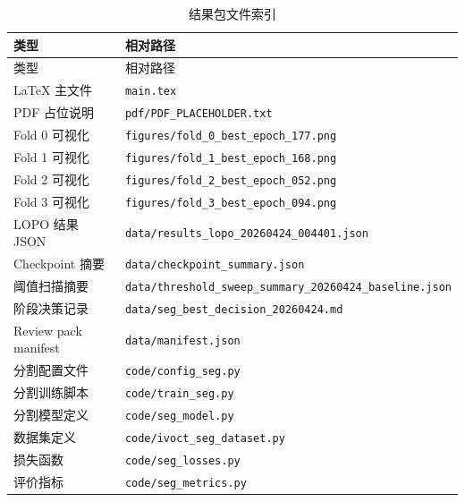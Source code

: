 \documentclass[UTF8,11pt]{ctexart}
\begin{document}
\begin{longtable}{p{}p{}}
\caption{结果包文件索引}
\label{tab:file-index}\\
\toprule
类型 & 相对路径 \\
\midrule
\endfirsthead
\toprule
类型 & 相对路径 \\
\midrule
\endhead
LaTeX 主文件 & \texttt{main.tex} \\
PDF 占位说明 & \texttt{pdf/PDF\_PLACEHOLDER.txt} \\
Fold 0 可视化 & \texttt{figures/fold\_0\_best\_epoch\_177.png} \\
Fold 1 可视化 & \texttt{figures/fold\_1\_best\_epoch\_168.png} \\
Fold 2 可视化 & \texttt{figures/fold\_2\_best\_epoch\_052.png} \\
Fold 3 可视化 & \texttt{figures/fold\_3\_best\_epoch\_094.png} \\
LOPO 结果 JSON & \texttt{data/results\_lopo\_20260424\_004401.json} \\
Checkpoint 摘要 & \texttt{data/checkpoint\_summary.json} \\
阈值扫描摘要 & \texttt{data/threshold\_sweep\_summary\_20260424\_baseline.json} \\
阶段决策记录 & \texttt{data/seg\_best\_decision\_20260424.md} \\
Review pack manifest & \texttt{data/manifest.json} \\
分割配置文件 & \texttt{code/config\_seg.py} \\
分割训练脚本 & \texttt{code/train\_seg.py} \\
分割模型定义 & \texttt{code/seg\_model.py} \\
数据集定义 & \texttt{code/ivoct\_seg\_dataset.py} \\
损失函数 & \texttt{code/seg\_losses.py} \\
评价指标 & \texttt{code/seg\_metrics.py} \\
\bottomrule
\end{longtable}
\end{document}
